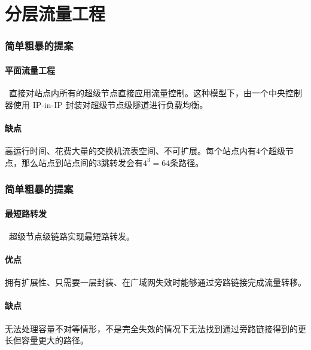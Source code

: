     \section{分层流量工程}

    \begin{frame}
        \frametitle{简单粗暴的提案}
        \framesubtitle{平面流量工程}
        ~直接对站点内所有的超级节点直接应用流量控制。这种模型下，由一个中央控制器使用 IP-in-IP 封装对超级节点级隧道进行负载均衡。

        \paragraph{缺点} 高运行时间、花费大量的交换机流表空间、不可扩展。每个站点内有4个超级节点，那么站点到站点间的3跳转发会有$4^3=64$条路径。
    \end{frame}

    \begin{frame}
        \frametitle{简单粗暴的提案}
        \framesubtitle{最短路转发}

        ~超级节点级链路实现最短路转发。

        \paragraph{优点}拥有扩展性、只需要一层封装、在广域网失效时能够通过\alert{旁路链接}完成流量转移。

        \paragraph{缺点}无法处理容量不对等情形，不是完全失效的情况下无法找到通过\alert{旁路链接}得到的更长但容量更大的路径。
        \hyperlink{asym<3>}{}
    \end{frame}

